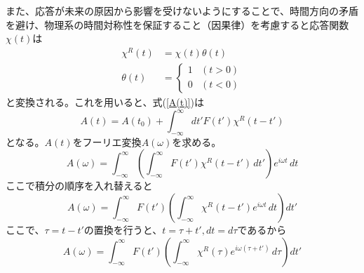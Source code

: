 \documentclass[11pt,a4j]{jreport}
\begin{document}
また、応答が未来の原因から影響を受けないようにすることで、時間方向の矛盾を避け、物理系の時間対称性を保証すること（因果律）を考慮すると応答関数$\chi(t)$は
\begin{align}
  \chi^R(t) &= \chi(t)\theta(t) \label{chi_R} \\
  \theta(t) &= \begin{cases} 
     1 & (t > 0)  \\
     0 & (t < 0)
   \end{cases} \label{theta_w}
 \end{align}
と変換される。これを用いると、式(\ref{A(t)})は
\begin{equation}
  A(t)=A(t_0)+\int_{-\infty}^{\infty}{dt'F(t') \chi^R(t-t')}
\end{equation}
となる。$A(t)$をフーリエ変換$A(\omega)$を求める。
\begin{equation}
  A(\omega)=\int_{-\infty}^{\infty} \left( \int_{-\infty}^{\infty} F(t') \chi^R(t - t') \, dt' \right) e^{i \omega t} \, dt
\end{equation}
ここで積分の順序を入れ替えると
\begin{equation}
  A(\omega) = \int_{-\infty}^{\infty} F(t') \left( \int_{-\infty}^{\infty} \chi^R(t - t') e^{i \omega t} \, dt \right) dt'
\end{equation}
ここで、$\tau=t-t'$の置換を行うと、$t=\tau+t',dt=d\tau$であるから
\begin{equation}
  A(\omega) = \int_{-\infty}^{\infty} F(t') \left( \int_{-\infty}^{\infty} \chi^R(\tau) e^{i \omega (\tau + t')} \, d\tau \right) dt'
\end{equation}
\end{document}
